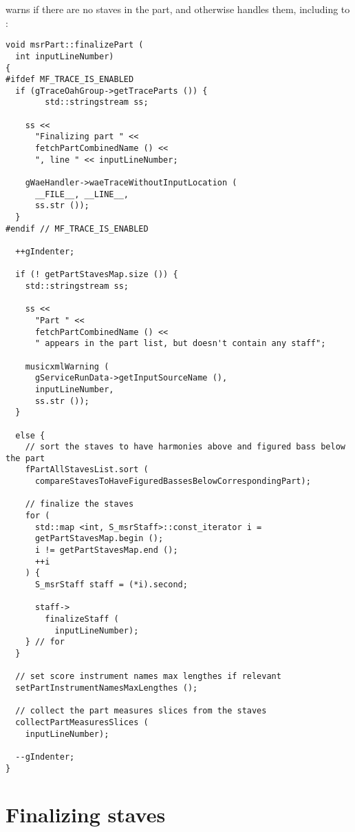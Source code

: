  warns if there are no staves in the part, and otherwise handles them, including \cascading to :
\begin{lstlisting}[language=CPlusPlus]
void msrPart::finalizePart (
  int inputLineNumber)
{
#ifdef MF_TRACE_IS_ENABLED
  if (gTraceOahGroup->getTraceParts ()) {
		std::stringstream ss;

    ss <<
      "Finalizing part " <<
      fetchPartCombinedName () <<
      ", line " << inputLineNumber;

    gWaeHandler->waeTraceWithoutInputLocation (
      __FILE__, __LINE__,
      ss.str ());
  }
#endif // MF_TRACE_IS_ENABLED

  ++gIndenter;

  if (! getPartStavesMap.size ()) {
    std::stringstream ss;

    ss <<
      "Part " <<
      fetchPartCombinedName () <<
      " appears in the part list, but doesn't contain any staff";

    musicxmlWarning (
      gServiceRunData->getInputSourceName (),
      inputLineNumber,
      ss.str ());
  }

  else {
    // sort the staves to have harmonies above and figured bass below the part
    fPartAllStavesList.sort (
      compareStavesToHaveFiguredBassesBelowCorrespondingPart);

    // finalize the staves
    for (
      std::map <int, S_msrStaff>::const_iterator i =
      getPartStavesMap.begin ();
      i != getPartStavesMap.end ();
      ++i
    ) {
      S_msrStaff staff = (*i).second;

      staff->
        finalizeStaff (
          inputLineNumber);
    } // for
  }

  // set score instrument names max lengthes if relevant
  setPartInstrumentNamesMaxLengthes ();

  // collect the part measures slices from the staves
  collectPartMeasuresSlices (
    inputLineNumber);

  --gIndenter;
}
\end{lstlisting}



\section{Finalizing staves}

